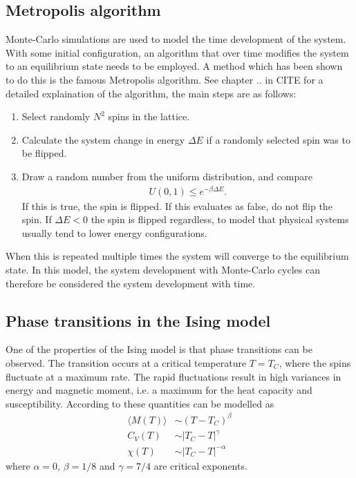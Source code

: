 \documentclass[aps,reprint]{revtex4-1}
\newcommand{\mean}[1]{\langle #1 \rangle}
\begin{document}
\subsection{Metropolis algorithm}
Monte-Carlo simulations are used to model the time development of the system.
With some initial configuration, an algorithm that over time modifies the system
to an equilibrium state needs to be employed. A method which has been shown to
do this is the famous Metropolis algorithm. See chapter .. in CITE for a detailed explaination
of the algorithm, the main steps are as follows:
\begin{enumerate}
  \item Select randomly $N^2$ spins in the lattice.
  \item Calculate the system change in energy $\Delta E$ if a randomly selected spin was to
  be flipped.
  \item Draw a random number from the uniform distribution, and compare
  \begin{align*}
    U(0,1) \leq e^{-\beta \Delta E}.
  \end{align*}
  If this is true, the spin is flipped. If this evaluates as false, do not flip
  the spin. If $\Delta E < 0$ the spin is flipped regardless, to model that physical
  systems usually tend to lower energy configurations.
\end{enumerate}
When this is repeated multiple times the system will converge to the equilibrium
state. In this model, the system development with Monte-Carlo cycles can therefore be
considered the system development with time.
\subsection{Phase transitions in the Ising model}
One of the properties of the Ising model is that phase transitions can be
observed. The transition occurs at a critical temperature $T = T_C$, where
the spins fluctuate at a maximum rate. The rapid fluctuations result in high
variances in energy and magnetic moment, i.e. a maximum for the heat capacity
and susceptibility. According to \cite{project4} these quantities can be
modelled as
\begin{align*}
  \mean{M(T)} &\sim (T - T_C)^\beta \\
  C_V(T) &\sim |T_C - T|^\gamma \\
  \chi (T) &\sim |T_C - T|^{-\alpha}
\end{align*}
where $\alpha = 0$, $\beta = 1/8$ and $\gamma = 7/4$ are critical exponents.
\end{document}
